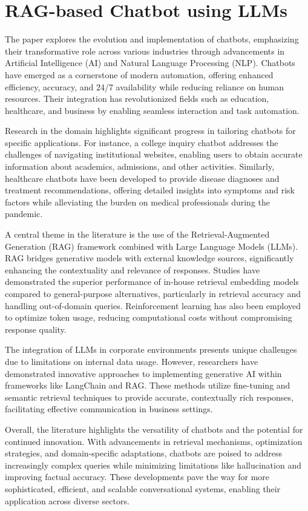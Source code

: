 \documentclass[12pt,a4paper]{report}
\begin{document}
\section{RAG-based Chatbot using LLMs}

The paper explores the evolution and implementation of chatbots, emphasizing their transformative role across various industries through advancements in Artificial Intelligence (AI) and Natural Language Processing (NLP). Chatbots have emerged as a cornerstone of modern automation, offering enhanced efficiency, accuracy, and 24/7 availability while reducing reliance on human resources. Their integration has revolutionized fields such as education, healthcare, and business by enabling seamless interaction and task automation.

Research in the domain highlights significant progress in tailoring chatbots for specific applications. For instance, a college inquiry chatbot addresses the challenges of navigating institutional websites, enabling users to obtain accurate information about academics, admissions, and other activities. Similarly, healthcare chatbots have been developed to provide disease diagnoses and treatment recommendations, offering detailed insights into symptoms and risk factors while alleviating the burden on medical professionals during the pandemic.

A central theme in the literature is the use of the Retrieval-Augmented Generation (RAG) framework combined with Large Language Models (LLMs). RAG bridges generative models with external knowledge sources, significantly enhancing the contextuality and relevance of responses. Studies have demonstrated the superior performance of in-house retrieval embedding models compared to general-purpose alternatives, particularly in retrieval accuracy and handling out-of-domain queries. Reinforcement learning has also been employed to optimize token usage, reducing computational costs without compromising response quality.

The integration of LLMs in corporate environments presents unique challenges due to limitations on internal data usage. However, researchers have demonstrated innovative approaches to implementing generative AI within frameworks like LangChain and RAG. These methods utilize fine-tuning and semantic retrieval techniques to provide accurate, contextually rich responses, facilitating effective communication in business settings.

Overall, the literature highlights the versatility of chatbots and the potential for continued innovation. With advancements in retrieval mechanisms, optimization strategies, and domain-specific adaptations, chatbots are poised to address increasingly complex queries while minimizing limitations like hallucination and improving factual accuracy. These developments pave the way for more sophisticated, efficient, and scalable conversational systems, enabling their application across diverse sectors.
\end{document}
